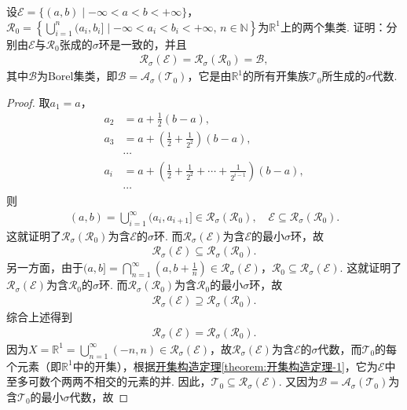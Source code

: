 \documentclass[../../main.tex]{subfiles}%
\begin{document}
\begin{example}
设$\mathscr{E}=\{(a,b)\mid -\infty<a<b<+\infty\}$，$\mathscr{R}_0=\left\{\bigcup_{i=1}^{n}(a_i,b_i]\mid -\infty<a_i<b_i<+\infty,\,n\in\mathbb{N}\right\}$为$\mathbb{R}^1$上的两个集类. 证明：分别由$\mathscr{E}$与$\mathscr{R}_0$张成的$\sigma$环是一致的，并且
\begin{align*}
\mathscr{R}_\sigma(\mathscr{E})=\mathscr{R}_\sigma(\mathscr{R}_0)=\mathscr{B},
\end{align*}
其中$\mathscr{B}$为Borel集类，即$\mathscr{B}=\mathscr{A}_\sigma(\mathscr{T}_0)$，它是由$\mathbb{R}^1$的所有开集族$\mathscr{T}_0$所生成的$\sigma$代数.
\end{example}
\begin{proof}
取$a_1=a$，
\begin{align*}
a_2&=a+\frac{1}{2}(b-a), \\
a_3&=a+\left(\frac{1}{2}+\frac{1}{2^2}\right)(b-a), \\
&\cdots \\
a_i&=a+\left(\frac{1}{2}+\frac{1}{2^2}+\cdots+\frac{1}{2^{i-1}}\right)(b-a), \\
&\cdots
\end{align*}
则
\begin{align*}
(a,b)=\bigcup_{i=1}^{\infty}(a_i,a_{i+1}]\in\mathscr{R}_\sigma(\mathscr{R}_0),\quad \mathscr{E}\subseteq\mathscr{R}_\sigma(\mathscr{R}_0).
\end{align*}
这就证明了$\mathscr{R}_\sigma(\mathscr{R}_0)$为含$\mathscr{E}$的$\sigma$环. 而$\mathscr{R}_\sigma(\mathscr{E})$为含$\mathscr{E}$的最小$\sigma$环，故
\begin{align*}
\mathscr{R}_\sigma(\mathscr{E})\subseteq\mathscr{R}_\sigma(\mathscr{R}_0).
\end{align*}
另一方面，由于$(a,b]=\bigcap_{n=1}^{\infty}\left(a,b+\frac{1}{n}\right)\in\mathscr{R}_\sigma(\mathscr{E})$，$\mathscr{R}_0\subseteq\mathscr{R}_\sigma(\mathscr{E})$. 这就证明了$\mathscr{R}_\sigma(\mathscr{E})$为含$\mathscr{R}_0$的$\sigma$环. 而$\mathscr{R}_\sigma(\mathscr{R}_0)$为含$\mathscr{R}_0$的最小$\sigma$环，故
\begin{align*}
\mathscr{R}_\sigma(\mathscr{E})\supseteq\mathscr{R}_\sigma(\mathscr{R}_0).
\end{align*}
综合上述得到
\begin{align*}
\mathscr{R}_\sigma(\mathscr{E})=\mathscr{R}_\sigma(\mathscr{R}_0).
\end{align*}
因为$X=\mathbb{R}^1=\bigcup_{n=1}^{\infty}(-n,n)\in\mathscr{R}_\sigma(\mathscr{E})$，故$\mathscr{R}_\sigma(\mathscr{E})$为含$\mathscr{E}$的$\sigma$代数，而$\mathscr{T}_0$的每个元素（即$\mathbb{R}^1$中的开集），根据\hyperref[theorem:开集构造定理-1]{开集构造定理\ref{theorem:开集构造定理-1}}，它为$\mathscr{E}$中至多可数个两两不相交的元素的并. 因此，$\mathscr{T}_0\subseteq\mathscr{R}_\sigma(\mathscr{E})$. 又因为$\mathscr{B}=\mathscr{A}_\sigma(\mathscr{T}_0)$为含$\mathscr{T}_0$的最小$\sigma$代数，故

\end{proof}
\end{document}
